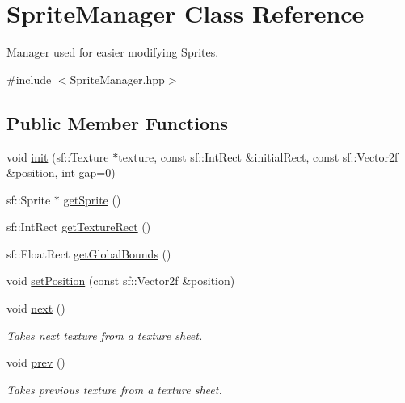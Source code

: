 \hypertarget{class_sprite_manager}{}\section{Sprite\+Manager Class Reference}
\label{class_sprite_manager}


Manager used for easier modifying Sprites.  




{\ttfamily \#include $<$Sprite\+Manager.\+hpp$>$}

\subsection*{Public Member Functions}
\begin{DoxyCompactItemize}
\item 
void \mbox{\hyperlink{class_sprite_manager_a6bc9f6b77d54099de6fcf84ec1e360bd}{init}} (sf\+::\+Texture $\ast$texture, const sf\+::\+Int\+Rect \&initial\+Rect, const sf\+::\+Vector2f \&position, int \mbox{\hyperlink{class_sprite_manager_a57bba66a27411c59651af826b50ec11d}{gap}}=0)
\item 
sf\+::\+Sprite $\ast$ \mbox{\hyperlink{class_sprite_manager_a9c0af555f22c9ea83a07ae3d1818db0e}{get\+Sprite}} ()
\item 
sf\+::\+Int\+Rect \mbox{\hyperlink{class_sprite_manager_af51994d0f3a5e847a8c55bb022f8b1e2}{get\+Texture\+Rect}} ()
\item 
sf\+::\+Float\+Rect \mbox{\hyperlink{class_sprite_manager_af4b1373fb34c1bf091e5023fe52c1bc0}{get\+Global\+Bounds}} ()
\item 
void \mbox{\hyperlink{class_sprite_manager_a9ef427743db56baec20673d877a63717}{set\+Position}} (const sf\+::\+Vector2f \&position)
\item 
void \mbox{\hyperlink{class_sprite_manager_acdcd181f96ed049db0bf445a71e4b6e2}{next}} ()
\begin{DoxyCompactList}\small\item\em Takes next texture from a texture sheet. \end{DoxyCompactList}\item 
void \mbox{\hyperlink{class_sprite_manager_a45d2b2613bb95d34ce8e0ad28e261ef1}{prev}} ()
\begin{DoxyCompactList}\small\item\em Takes previous texture from a texture sheet. \end{DoxyCompactList}\end{DoxyCompactItemize}

